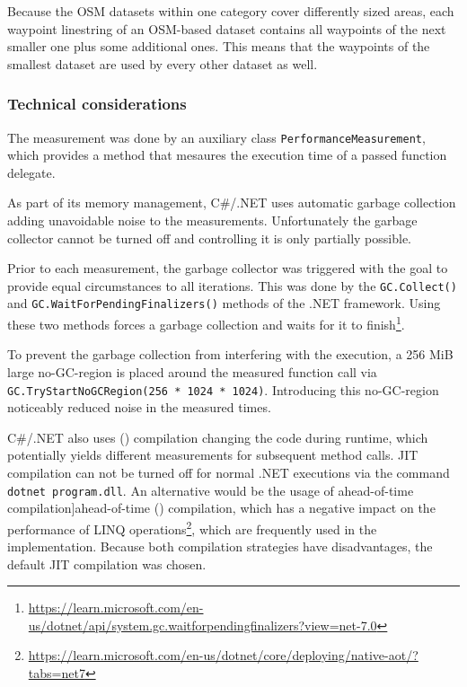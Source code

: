 			Because the OSM datasets within one category cover differently sized areas, each waypoint linestring of an OSM-based dataset contains all waypoints of the next smaller one plus some additional ones.
			This means that the waypoints of the smallest dataset are used by every other dataset as well.
		
		\subsubsection{Technical considerations}
		
			The measurement was done by an auxiliary class \texttt{PerformanceMeasurement}, which provides a method that mesaures the execution time of a passed function delegate.
			
			As part of its memory management, C\#/.NET uses automatic garbage collection adding unavoidable noise to the measurements.
			Unfortunately the garbage collector cannot be turned off and controlling it is only partially possible.
			
			Prior to each measurement, the garbage collector was triggered with the goal to provide equal circumstances to all iterations.
			This was done by the \texttt{GC.Collect()} and \texttt{GC.WaitForPendingFinalizers()} methods of the .NET framework.
			Using these two methods forces a garbage collection and waits for it to finish\footnote{\url{https://learn.microsoft.com/en-us/dotnet/api/system.gc.waitforpendingfinalizers?view=net-7.0}}.
			
			To prevent the garbage collection from interfering with the execution, a 256 MiB large no-GC-region is placed around the measured function call via \texttt{GC.TryStartNoGCRegion(256 * 1024 * 1024)}.
			Introducing this no-GC-region noticeably reduced noise in the measured times.
		
			C\#/.NET also uses  () compilation changing the code during runtime, which potentially yields different measurements for subsequent method calls.
			JIT compilation can not be turned off for normal .NET executions via the command \texttt{dotnet program.dll}.
			An alternative would be the usage of \term*[]ahead-of-time compilation]{ahead-of-time} () compilation, which has a negative impact on the performance of LINQ operations\footnote{\url{https://learn.microsoft.com/en-us/dotnet/core/deploying/native-aot/?tabs=net7}}, which are frequently used in the implementation.
			Because both compilation strategies have disadvantages, the default JIT compilation was chosen.
			
